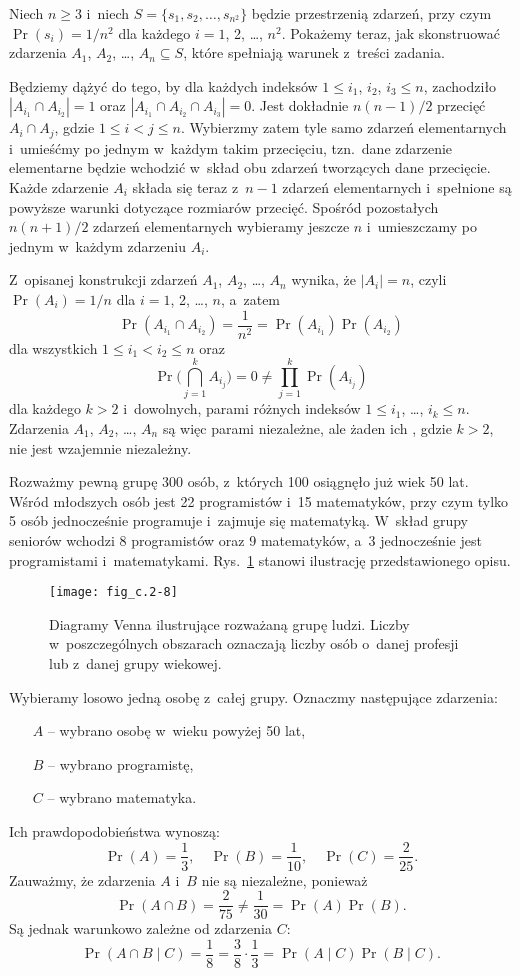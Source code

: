 \exercise %
Niech $n\ge3$ i~niech $S=\{s_1,s_2,\dots,s_{n^2}\}$ będzie przestrzenią zdarzeń, przy czym $\Pr(s_i)=1/n^2$ dla każdego $i=1$, 2, \dots, $n^2$.
Pokażemy teraz, jak skonstruować zdarzenia $A_1$, $A_2$, \dots, $A_n\subseteq S$, które spełniają warunek z~treści zadania.

Będziemy dążyć do tego, by dla każdych indeksów $1\le i_1$, $i_2$, $i_3\le n$, zachodziło $|A_{i_1}\cap A_{i_2}|=1$ oraz $|A_{i_1}\cap A_{i_2}\cap A_{i_3}|=0$.
Jest dokładnie $n(n-1)/2$ przecięć $A_i\cap A_j$, gdzie $1\le i<j\le n$.
Wybierzmy zatem tyle samo zdarzeń elementarnych i~umieśćmy po jednym w~każdym takim przecięciu, tzn.\ dane zdarzenie elementarne będzie wchodzić w~skład obu zdarzeń tworzących dane przecięcie.
Każde zdarzenie $A_i$ składa się teraz z~$n-1$ zdarzeń elementarnych i~spełnione są powyższe warunki dotyczące rozmiarów przecięć.
Spośród pozostałych $n(n+1)/2$ zdarzeń elementarnych wybieramy jeszcze $n$ i~umieszczamy po jednym w~każdym zdarzeniu $A_i$.

Z~opisanej konstrukcji zdarzeń $A_1$, $A_2$, \dots, $A_n$ wynika, że $|A_i|=n$, czyli $\Pr(A_i)=1/n$ dla $i=1$, 2, \dots, $n$, a~zatem
\[
	\Pr(A_{i_1}\cap A_{i_2}) = \frac{1}{n^2} = \Pr(A_{i_1})\Pr(A_{i_2})
\]
dla wszystkich $1\le i_1<i_2\le n$ oraz
\[
	\Pr\biggl(\bigcap_{j=1}^kA_{i_j}\biggr) = 0 \ne \prod_{j=1}^k\Pr(A_{i_j})
\]
dla każdego $k>2$ i~dowolnych, parami różnych indeksów $1\le i_1$, \dots, $i_k\le n$.
Zdarzenia $A_1$, $A_2$, \dots, $A_n$ są więc parami niezależne, ale żaden ich , gdzie $k>2$, nie jest wzajemnie niezależny.

\exercise %
Rozważmy pewną grupę 300 osób, z~których 100 osiągnęło już wiek 50 lat.
Wśród młodszych osób jest 22 programistów i~15 matematyków, przy czym tylko 5 osób jednocześnie programuje i~zajmuje się matematyką.
W~skład grupy seniorów wchodzi 8 programistów oraz 9 matematyków, a~3 jednocześnie jest programistami i~matematykami.
Rys.\ \ref{fig:C.2-8} stanowi ilustrację przedstawionego opisu.
\begin{figure}[ht]
	\begin{center}
		\texttt{[image: fig\_c.2-8]}
	\end{center}
	\caption{Diagramy Venna ilustrujące rozważaną grupę ludzi.
Liczby w~poszczególnych obszarach oznaczają liczby osób o~danej profesji lub z~danej grupy wiekowej.} \label{fig:C.2-8}
\end{figure}

Wybieramy losowo jedną osobę z~całej grupy.
Oznaczmy następujące zdarzenia:
\begin{itemize}
	\item[$A$] -- wybrano osobę w~wieku powyżej 50 lat,
	\item[$B$] -- wybrano programistę,
	\item[$C$] -- wybrano matematyka.
\end{itemize}
Ich prawdopodobieństwa wynoszą:
\[
	\Pr(A) = \frac{1}{3}, \quad \Pr(B) = \frac{1}{10}, \quad \Pr(C) = \frac{2}{25}.
\]
Zauważmy, że zdarzenia $A$ i~$B$ nie są niezależne, ponieważ
\[
	\Pr(A\cap B) = \frac{2}{75} \ne \frac{1}{30} = \Pr(A)\Pr(B).
\]
Są jednak warunkowo zależne od zdarzenia $C$:
\[
	\Pr(A\cap B\mid C) = \frac{1}{8} = \frac{3}{8}\cdot\frac{1}{3} = \Pr(A\mid C)\Pr(B\mid C).
\]

